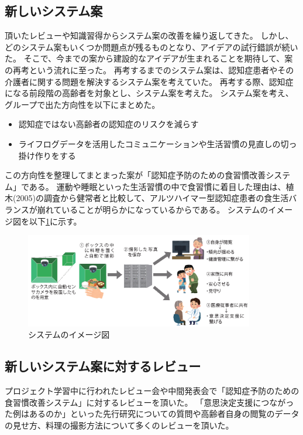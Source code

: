 \documentclass[../report]{subfiles}
\begin{document}
\subsection{新しいシステム案}
頂いたレビューや知識習得からシステム案の改善を繰り返してきた。
しかし、どのシステム案もいくつか問題点が残るものとなり、アイデアの試行錯誤が続いた。
そこで、今までの案から建設的なアイデアが生まれることを期待して、案の再考という流れに至った。
再考するまでのシステム案は、認知症患者やその介護者に関する問題を解決するシステム案を考えていた。
再考する際、認知症になる前段階の高齢者を対象とし、システム案を考えた。
システム案を考え、グループで出た方向性を以下にまとめた。
\begin{itemize}
    \item 認知症ではない高齢者の認知症のリスクを減らす
    \item ライフログデータを活用したコミュニケーションや生活習慣の見直しの切っ掛け作りをする
\end{itemize}
この方向性を整理してまとまった案が「認知症予防のための食習慣改善システム」である。
運動や睡眠といった生活習慣の中で食習慣に着目した理由は、植木(2005)の調査から健常者と比較して、アルツハイマー型認知症患者の食生活バランスが崩れていることが明らかになっている\cite{ueki}からである。
システムのイメージ図を以下\ref{fig:sys-image}に示す。
\begin{figure}[htbp]
    \begin{center}
        \includegraphics[width=10cm]{imgs/system-overview.png}
        \caption{システムのイメージ図}
        \label{fig:sys-image}
    \end{center}
\end{figure}

\subsection{新しいシステム案に対するレビュー}
プロジェクト学習中に行われたレビュー会や中間発表会で「認知症予防のための食習慣改善システム」に対するレビューを頂いた。
「意思決定支援につながった例はあるのか」といった先行研究についての質問や高齢者自身の閲覧のデータの見せ方、料理の撮影方法について多くのレビューを頂いた。
\end{document}
